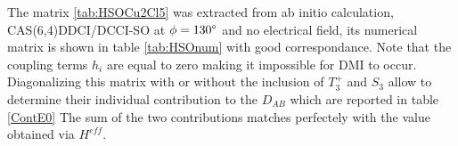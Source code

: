 \documentclass[10pt]{report}
\numberwithin{equation}{section}
\begin{document}
\begin{table}[!h]
    \centering
\caption{Numerical matrix of $\hat{H}^{SO}$ and electronic couplings in the uncoupled basis from a CAS(6,4)DDCI/DDCI-SO calculation with no electric field and $\phi=130\degree$.}
\label{tab:HSOnum}
\end{table}
The matrix \ref{tab:HSOCu2Cl5} was extracted from ab initio calculation, CAS(6,4)DDCI/DCCI-SO at $\phi=130\degree$ and no electrical field, its numerical matrix is shown in table \ref{tab:HSOnum} with good correspondance. 
Note that the coupling terms $h_i$ are equal to zero making it impossible for DMI to occur.
Diagonalizing this matrix with or without the inclusion of $T_3^+$ and $S_3$ allow to determine their individual contribution to the $D_{AB}$ which are reported in table \ref{ContE0}
The sum of the two contributions matches perfectely with the value obtained via $H^{eff}$.
\end{document}
